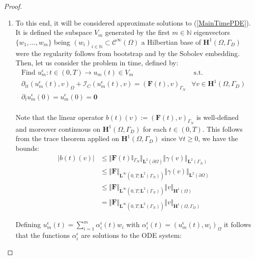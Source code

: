 \begin{proof}
\begin{enumerate}
    \item To this end, it will be considered approximate solutions to (\ref{MainTimePDE}). It is defined the subspace $V_m$ generated by the first $m \in \mathbb{N}$ eigenvectors $\{w_1, \dots, w_m \}$ being $(w_i)_{i \in \mathbb{N}} \subset \mathcal{C}^{\infty}(\Omega)$ a Hilbertian base of $\mathbf{H}^1(\Omega, \Gamma_D)$ were the regularity follows from bootstrap and by the Sobolev embedding.
    Then, let us consider the problem in time, defined by:
    \begin{equation}
        \label{ApproxTimePDE}
        \begin{array}{cc}
            \text{Find } u^{\epsilon}_m: t \in (0,T) \longrightarrow u_m(t) \in V_m & \text{ s.t. } \\
            \partial_{tt}(u_m^{\epsilon}(t),v)_{\Omega} + \mathcal{I}_{C}(u^{\epsilon}_m(t),v) = (\mathbf{F}(t),v)_{\Gamma_N} & \forall v \in \mathbf{H}^1(\Omega,\Gamma_D) \\
            \partial_{t} u^{\epsilon}_m(0) = u^{\epsilon}_m(0) = \mathbf{0} & \\
        \end{array}
    \end{equation}
    \begin{rem}
    Note that the linear operator $b(t)(v) := (\mathbf{F}(t),v)_{\Gamma_N}$ is well-defined and moreover continuous on $\mathbf{H}^1(\Omega,\Gamma_D)$ for each $t \in (0,T)$.
    This follows from the trace theorem applied on $\mathbf{H}^1(\Omega, \Gamma_D)$ since $\forall t \geq 0$, we have the bounds:
    \begin{align*}
        \vert b(t)(v) \vert & \leq \Vert \mathbf{F}(t) \mathbb{I}_{\Gamma_N} \Vert_{\mathbf{L}^2(\partial \Omega)} \Vert \gamma (v) \Vert_{\mathbf{L}^2(\Gamma_N)} \\
        & \leq \Vert \mathbf{F}\Vert_{\mathbf{L}^{\infty}(0,T;\mathbf{L}^2(\Gamma_N))} \Vert \gamma(v) \Vert_{\mathbf{L}^2(\partial \Omega)} \\
        & \leq \Vert \mathbf{F} \Vert_{\mathbf{L}^{\infty}(0,T;\mathbf{L}^2(\Gamma_N))} \Vert v \Vert_{\mathbf{H}^1(\Omega)}\\
        & = \Vert \mathbf{F}\Vert_{\mathbf{L}^{\infty}(0,T;\mathbf{L}^2(\Gamma_N))} \Vert v \Vert_{\mathbf{H}^1(\Omega, \Gamma_D)}
    \end{align*}
    \end{rem}
    Defining $u^{\epsilon}_m(t) = \sum_{i=1}^m \alpha_i^{\epsilon}(t) w_i$ with $\alpha_i^{\epsilon} (t) = (u^{\epsilon}_m(t),w_i)_{\Omega}$ it follows that the functions $\alpha_i^{\epsilon}$ are solutions to the ODE system:

\end{enumerate}
\end{proof}
